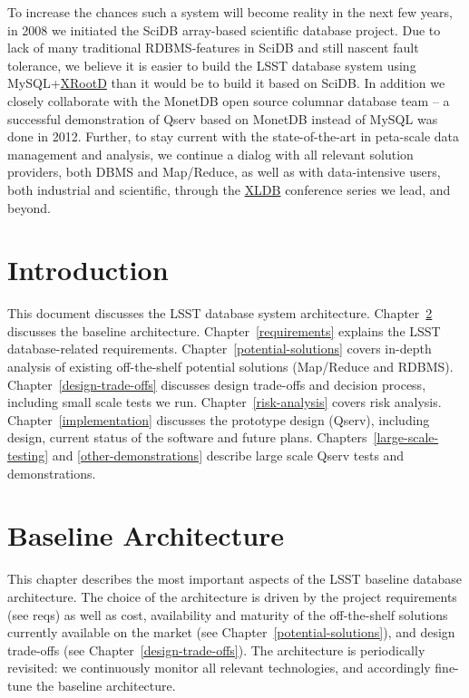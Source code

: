 \documentclass[DM,lsstdraft,toc]{lsstdoc}
\begin{document}
To increase the chances such a system will become reality in the next
few years, in 2008 we initiated the SciDB array-based scientific
database project. Due to lack of many traditional RDBMS-features in
SciDB and still nascent fault tolerance, we believe it is easier to
build the LSST database system using
MySQL+\href{http://xrootd.org}{XRootD} than it would be to build it
based on SciDB. In addition we closely collaborate with the MonetDB open
source columnar database team -- a successful demonstration of Qserv
based on MonetDB instead of MySQL was done in 2012. Further, to stay
current with the state-of-the-art in peta-scale data management and
analysis, we continue a dialog with all relevant solution providers,
both DBMS and Map/Reduce, as well as with data-intensive users, both
industrial and scientific, through the \href{http://xldb.org}{XLDB}
conference series we lead, and beyond.

\section{Introduction}\label{introduction}

This document discusses the LSST database system architecture. Chapter~\ref{baseline-architecture} discusses the baseline
architecture. Chapter~\ref{requirements} explains the LSST database-related
requirements. Chapter~\ref{potential-solutions} covers in-depth analysis
of existing off-the-shelf potential solutions (Map/Reduce and RDBMS).
Chapter~\ref{design-trade-offs} discusses design trade-offs
and decision process, including small scale tests we run.
Chapter~\ref{risk-analysis} covers risk analysis.
Chapter~\ref{implementation} discusses the
prototype design (Qserv), including design, current status of the
software and future plans.
Chapters~\ref{large-scale-testing} and \ref{other-demonstrations}
describe large scale Qserv
tests and demonstrations.

\section{Baseline Architecture}\label{baseline-architecture}

This chapter describes the most important aspects of the LSST baseline
database architecture. The choice of the architecture is driven by the
project requirements (see reqs) as well as cost, availability and
maturity of the off-the-shelf solutions currently available on the
market (see Chapter~\ref{potential-solutions}), and design trade-offs (see
Chapter~\ref{design-trade-offs}). The architecture is periodically revisited: we
continuously monitor all relevant technologies, and accordingly
fine-tune the baseline architecture.
\end{document}
